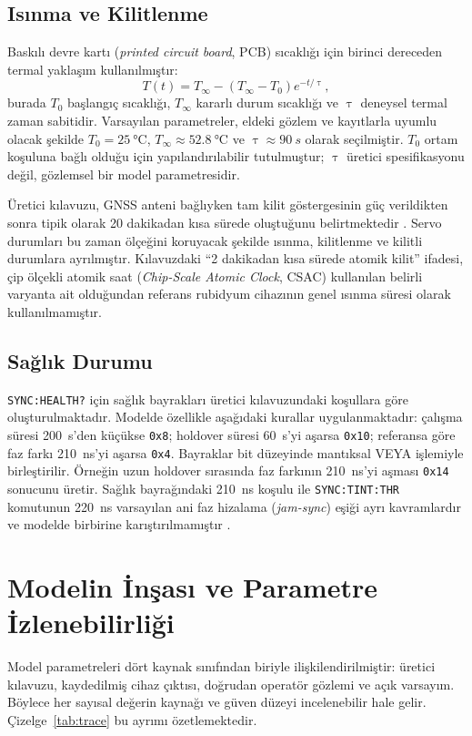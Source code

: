\documentclass[9pt,twocolumn,a4paper]{extarticle}
\begin{document}
\subsection{Isınma ve Kilitlenme}
Baskılı devre kartı (\emph{printed circuit board}, PCB) sıcaklığı için birinci dereceden termal yaklaşım kullanılmıştır:
\begin{equation}
 T(t)=T_{\infty}-\left(T_{\infty}-T_0\right)e^{-t/\uptau},
 \label{eq:thermal}
\end{equation}
burada $T_0$ başlangıç sıcaklığı, $T_{\infty}$ kararlı durum sıcaklığı ve $\uptau$ deneysel termal zaman sabitidir. Varsayılan parametreler, eldeki gözlem ve kayıtlarla uyumlu olacak şekilde $T_0=\SI{25}{\celsius}$, $T_{\infty}\approx\SI{52.8}{\celsius}$ ve $\uptau\approx\SI{90}{s}$ olarak seçilmiştir. $T_0$ ortam koşuluna bağlı olduğu için yapılandırılabilir tutulmuştur; $\uptau$ üretici spesifikasyonu değil, gözlemsel bir model parametresidir.

Üretici kılavuzu, GNSS anteni bağlıyken tam kilit göstergesinin güç verildikten sonra tipik olarak 20 dakikadan kısa sürede oluştuğunu belirtmektedir \cite{jlt2015}. Servo durumları bu zaman ölçeğini koruyacak şekilde ısınma, kilitlenme ve kilitli durumlara ayrılmıştır. Kılavuzdaki ``2 dakikadan kısa sürede atomik kilit'' ifadesi, çip ölçekli atomik saat (\emph{Chip-Scale Atomic Clock}, CSAC) kullanılan belirli varyanta ait olduğundan referans rubidyum cihazının genel ısınma süresi olarak kullanılmamıştır.

\subsection{Sağlık Durumu}
\texttt{SYNC:HEALTH?} için sağlık bayrakları üretici kılavuzundaki koşullara göre oluşturulmaktadır. Modelde özellikle aşağıdaki kurallar uygulanmaktadır: çalışma süresi 200~s'den küçükse \texttt{0x8}; holdover süresi 60~s'yi aşarsa \texttt{0x10}; referansa göre faz farkı 210~ns'yi aşarsa \texttt{0x4}. Bayraklar bit düzeyinde mantıksal VEYA işlemiyle birleştirilir. Örneğin uzun holdover sırasında faz farkının 210~ns'yi aşması \texttt{0x14} sonucunu üretir. Sağlık bayrağındaki 210~ns koşulu ile \texttt{SYNC:TINT:THR} komutunun 220~ns varsayılan ani faz hizalama (\emph{jam-sync}) eşiği ayrı kavramlardır ve modelde birbirine karıştırılmamıştır \cite{jlt2015}.

\section{Modelin İnşası ve Parametre İzlenebilirliği}
Model parametreleri dört kaynak sınıfından biriyle ilişkilendirilmiştir: üretici kılavuzu, kaydedilmiş cihaz çıktısı, doğrudan operatör gözlemi ve açık varsayım. Böylece her sayısal değerin kaynağı ve güven düzeyi incelenebilir hale gelir. Çizelge~\ref{tab:trace} bu ayrımı özetlemektedir.
\end{document}
